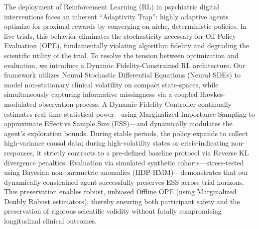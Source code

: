 The deployment of Reinforcement Learning (RL) in psychiatric digital interventions faces an inherent ``Adaptivity Trap'': highly adaptive agents optimize for proximal rewards by converging on niche, deterministic policies. In live trials, this behavior eliminates the stochasticity necessary for Off-Policy Evaluation (OPE), fundamentally violating algorithm fidelity and degrading the scientific utility of the trial. To resolve the tension between optimization and evaluation, we introduce a Dynamic Fidelity-Constrained RL architecture. Our framework utilizes Neural Stochastic Differential Equations (Neural SDEs) to model non-stationary clinical volatility on compact state-spaces, while simultaneously capturing informative missingness via a coupled Hawkes-modulated observation process. A Dynamic Fidelity Controller continually estimates real-time statistical power---using Marginalized Importance Sampling to approximate Effective Sample Size (ESS)---and dynamically modulates the agent’s exploration bounds. During stable periods, the policy expands to collect high-variance causal data; during high-volatility states or crisis-indicating non-responses, it strictly contracts to a pre-defined baseline protocol via Reverse KL divergence penalties. Evaluation via simulated synthetic cohorts---stress-tested using Bayesian non-parametric anomalies (HDP-HMM)---demonstrates that our dynamically constrained agent successfully preserves ESS across trial horizons. This preservation enables robust, unbiased Offline OPE (using Marginalized Doubly Robust estimators), thereby ensuring both participant safety and the preservation of rigorous scientific validity without fatally compromising longitudinal clinical outcomes.
